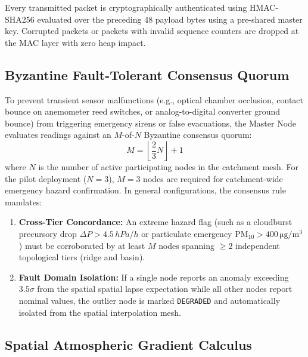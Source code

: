 \documentclass[journal,a4paper]{IEEEtran}
\begin{document}
Every transmitted packet is cryptographically authenticated using HMAC-SHA256 evaluated over the preceding 48 payload bytes using a pre-shared master key. Corrupted packets or packets with invalid sequence counters are dropped at the MAC layer with zero heap impact.

\subsection{Byzantine Fault-Tolerant Consensus Quorum}

To prevent transient sensor malfunctions (e.g., optical chamber occlusion, contact bounce on anemometer reed switches, or analog-to-digital converter ground bounce) from triggering emergency sirens or false evacuations, the Master Node evaluates readings against an $M$-of-$N$ Byzantine consensus quorum:
\begin{equation}
M = \left\lfloor \frac{2}{3} N \right\rfloor + 1
\end{equation}
where $N$ is the number of active participating nodes in the catchment mesh. For the pilot deployment ($N=3$), $M = 3$ nodes are required for catchment-wide emergency hazard confirmation. In general configurations, the consensus rule mandates:
\begin{enumerate}
  \item \textbf{Cross-Tier Concordance:} An extreme hazard flag (such as a cloudburst precursory drop $\Delta P > 4.5\,\si{hPa/h}$ or particulate emergency $\text{PM}_{10} > 400\,\si{\micro\gram\per\cubic\metre}$) must be corroborated by at least $M$ nodes spanning $\ge 2$ independent topological tiers (ridge and basin).
  \item \textbf{Fault Domain Isolation:} If a single node reports an anomaly exceeding $3.5\sigma$ from the spatial spatial lapse expectation while all other nodes report nominal values, the outlier node is marked \texttt{DEGRADED} and automatically isolated from the spatial interpolation mesh.
\end{enumerate}

\subsection{Spatial Atmospheric Gradient Calculus}
\end{document}
